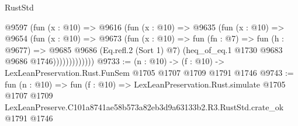 \begin{lexlean}{RustStd}
\begin{coremodule}
                @9597
                  (fun (x : @10) =>
                  @9616
                    (fun (x : @10) =>
                    @9635
                      (fun (x : @10) =>
                      @9654
                        (fun (x : @10) =>
                        @9673
                          (fun (x : @10) =>
                          fun (fn : @7) =>
                          fun (h : @9677) =>
                          @9685
                            @9686
                            (Eq.refl.{2} (Sort 1) @7)
                            (heq_of_eq.{1} @1730 @9683 @9686 @1746)))))))))))))
@9733 := (n : @10) -> (f : @10) -> LexLeanPreservation.Rust.FunSem @1705 @1707 @1709 @1791 @1746
@9743 := fun (n : @10) =>
  fun (f : @10) =>
  LexLeanPreservation.Rust.simulate
    @1705
    @1707
    @1709
    LexLeanPreserve.C101a8741ae58b573a82eb3d9a63133b2.R3.RustStd.crate_ok
    @1791
    @1746
\end{coremodule}
\end{lexlean}
